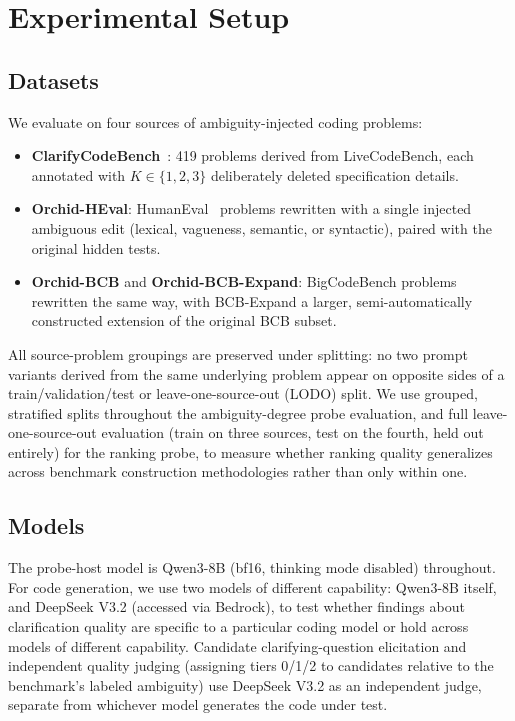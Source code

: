 \section{Experimental Setup}
\label{sec:experimental_setup}

\subsection{Datasets}

We evaluate on four sources of ambiguity-injected coding problems:

\begin{itemize}
\item \textbf{ClarifyCodeBench}~\cite{clarifycodebench}: 419 problems
derived from LiveCodeBench, each annotated with $K \in \{1,2,3\}$
deliberately deleted specification details.
\item \textbf{Orchid-HEval}: HumanEval~\cite{humaneval} problems rewritten
with a single injected ambiguous edit (lexical, vagueness, semantic, or
syntactic), paired with the original hidden tests.
\item \textbf{Orchid-BCB} and \textbf{Orchid-BCB-Expand}: BigCodeBench
\cite{bigcodebench} problems rewritten the same way, with BCB-Expand a
larger, semi-automatically constructed extension of the original BCB
subset.
\end{itemize}

All source-problem groupings are preserved under splitting: no two prompt
variants derived from the same underlying problem appear on opposite sides
of a train/validation/test or leave-one-source-out (LODO) split. We use
grouped, stratified splits throughout the ambiguity-degree probe
evaluation, and full leave-one-source-out evaluation (train on three
sources, test on the fourth, held out entirely) for the ranking probe, to
measure whether ranking quality generalizes across benchmark construction
methodologies rather than only within one.

\subsection{Models}

The probe-host model is Qwen3-8B (bf16, thinking mode disabled) throughout.
For code generation, we use two models of different capability: Qwen3-8B
itself, and DeepSeek V3.2 (accessed via Bedrock), to test whether findings
about clarification quality are specific to a particular coding model or
hold across models of different capability. Candidate clarifying-question
elicitation and independent quality judging (assigning tiers 0/1/2 to
candidates relative to the benchmark's labeled ambiguity) use DeepSeek V3.2
as an independent judge, separate from whichever model generates the code
under test.

